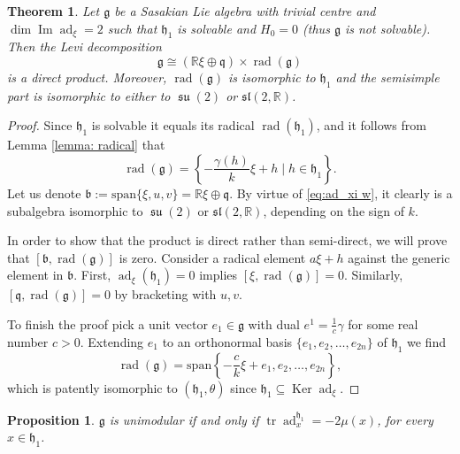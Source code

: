 \documentclass[12pt, twoside]{amsart}
\def\g{\mathfrak{g}}
\def\h{\mathfrak{h}}
\def\q{\mathfrak{q}}
\def\R{\mathbb{R}}
\def\ad{\operatorname{ad}}
\renewcommand{\Im}{\operatorname{Im}}
\def\Ker{\operatorname{Ker}}
\newcommand{\lie}[1]{\mathfrak{#1}}
\DeclareMathOperator{\su}{\lie{su}}
\def\rad{\operatorname{rad}}
\def\tr{\operatorname{tr}}
\newtheorem{prop}[definition]{Proposition}
\newtheorem{thm}[definition]{Theorem}
\theoremstyle{definition}
\begin{document}
\begin{thm}
Let $\g$ be a Sasakian Lie algebra with trivial centre and $\dim \Im \ad_{\xi}=2$ such that $\h_1$ is solvable and $H_{0}=0$ (thus $\g$ is not solvable). Then the Levi decomposition 
$$\g\cong (\R\xi\oplus {\q}) \times \rad(\g)$$ 
is a direct product. Moreover, $\rad(\g)$ is 
isomorphic to $\h_1$ and the semisimple part is  isomorphic to 
either to $\su(2)$ or $\mathfrak{sl}(2,\R)$.
\end{thm}
\begin{proof}
Since $\h_1$ is solvable it equals its radical $\rad(\h_1)$, and it follows from Lemma \ref{lemma: radical} that 
\[\rad(\g)= \left\{-\frac{\gamma(h)}{k} \xi+ h\mid h\in\h_1\right\}. \]
Let us denote $\mathfrak b:=\text{span}\{\xi, u, v\}=\R\xi\oplus {\q}$. 
By virtue of \eqref{eq:ad_xi w}, it clearly is a subalgebra 
isomorphic to $\su(2)$ or $\mathfrak{sl}(2,\R)$, depending on the sign of $k$. \par
\quad In order to show that the product is direct rather than semi-direct, we will prove that $[\mathfrak{b}, \rad(\g)]$ is zero. Consider a radical element $a\xi+h$ against the generic element in $\mathfrak{b}$. 
First, $\ad_\xi(\h_1)=0$ implies $[\xi, \rad(\g)]=0$. 
Similarly, $[{\q}, \rad(\g)]=0$ by bracketing with $u,v$. \par
\quad To finish the proof pick a unit vector $e_1\in \g$ with dual $ e^1= \frac 1c \gamma$ for some real number $c>0$. Extending $e_1$ to an orthonormal basis $\{e_1, e_2, \ldots,  e_{2n}\}$ of $\h_1$ we find
\[\rad(\g)=\text{span}\left\{-\frac{c}{k}\xi+e_1, e_2, \ldots,  e_{2n}\right \},\]
which is patently isomorphic to $(\h_1,\theta)$ since $\h_1\subseteq \Ker\ad_\xi$.
\end{proof}


\begin{prop}\label{g unimodular}
     $\mathfrak{g}$ is unimodular  if and only if
$\tr \ad ^{\h_1} _{x}=-2\mu(x)$, for every  $x \in \h_1$.
\end{prop}
\end{document}
